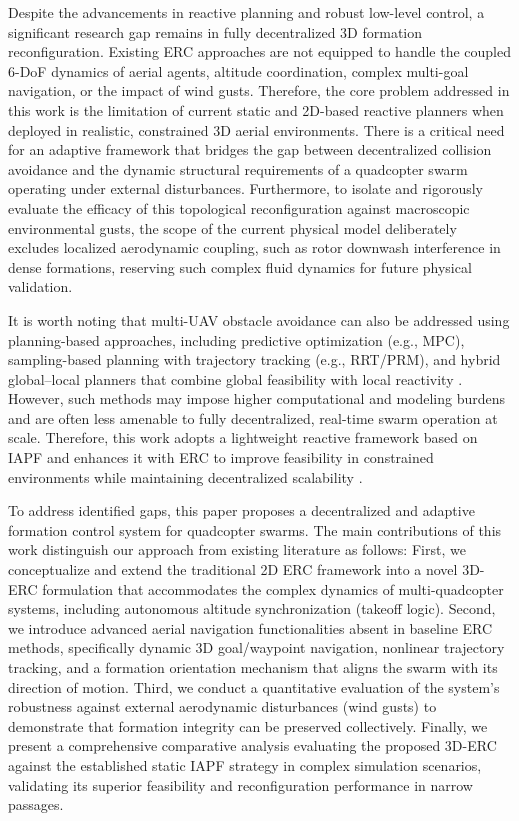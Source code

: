 \documentclass[pdflatex,sn-basic]{sn-jnl}%
\begin{document}
    Despite the advancements in reactive planning and robust low-level control, a significant research gap remains in fully decentralized 3D formation reconfiguration. Existing ERC approaches are not equipped to handle the coupled 6-DoF dynamics of aerial agents, altitude coordination, complex multi-goal navigation, or the impact of wind gusts. Therefore, the core problem addressed in this work is the limitation of current static and 2D-based reactive planners when deployed in realistic, constrained 3D aerial environments. There is a critical need for an adaptive framework that bridges the gap between decentralized collision avoidance and the dynamic structural requirements of a quadcopter swarm operating under external disturbances. Furthermore, to isolate and rigorously evaluate the efficacy of this topological reconfiguration against macroscopic environmental gusts, the scope of the current physical model deliberately excludes localized aerodynamic coupling, such as rotor downwash interference in dense formations, reserving such complex fluid dynamics for future physical validation.

    It is worth noting that multi-UAV obstacle avoidance can also be addressed using planning-based approaches, including predictive optimization (e.g., MPC), sampling-based planning with trajectory tracking (e.g., RRT/PRM), and hybrid global--local planners that combine global feasibility with local reactivity \citep{kallies_multi-agent_2024, burzynski_trajectory_2024, aggarwal_path_2020, shao_research_2025}. However, such methods may impose higher computational and modeling burdens and are often less amenable to fully decentralized, real-time swarm operation at scale. Therefore, this work adopts a lightweight reactive framework based on IAPF and enhances it with ERC to improve feasibility in constrained environments while maintaining decentralized scalability \citep{rahman_survey_2025}.

    To address identified gaps, this paper proposes a decentralized and adaptive formation control system for quadcopter swarms. The main contributions of this work distinguish our approach from existing literature as follows: First, we conceptualize and extend the traditional 2D ERC framework into a novel 3D-ERC formulation that accommodates the complex dynamics of multi-quadcopter systems, including autonomous altitude synchronization (takeoff logic). Second, we introduce advanced aerial navigation functionalities absent in baseline ERC methods, specifically dynamic 3D goal/waypoint navigation, nonlinear trajectory tracking, and a formation orientation mechanism that aligns the swarm with its direction of motion. Third, we conduct a quantitative evaluation of the system's robustness against external aerodynamic disturbances (wind gusts) to demonstrate that formation integrity can be preserved collectively. Finally, we present a comprehensive comparative analysis evaluating the proposed 3D-ERC against the established static IAPF strategy in complex simulation scenarios, validating its superior feasibility and reconfiguration performance in narrow passages.
\end{document}
